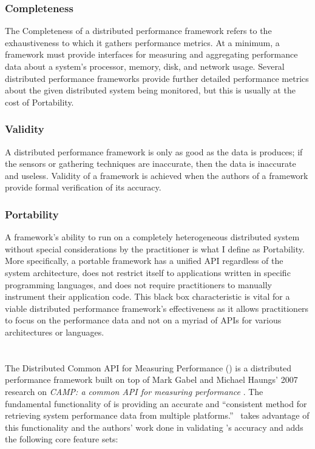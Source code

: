 \subsubsection{Completeness}

The Completeness of a distributed performance framework refers to the exhaustiveness to which it gathers performance
metrics. At a minimum, a framework must provide interfaces for measuring and aggregating performance data about a
system's processor, memory, disk, and network usage. Several distributed performance frameworks provide further detailed
performance metrics about the given distributed system being monitored, but this is usually at the cost of Portability.

\subsubsection{Validity}

A distributed performance framework is only as good as the data is produces; if the sensors or gathering techniques are
inaccurate, then the data is inaccurate and useless. Validity of a framework is achieved when the authors of a framework
provide formal verification of its accuracy.

\subsubsection{Portability}

A framework's ability to run on a completely heterogeneous distributed system without special considerations by the
practitioner is what I define as Portability. More specifically, a portable framework has a unified API regardless of
the system architecture, does not restrict itself to applications written in specific programming languages, and does
not require practitioners to manually instrument their application code. This black box characteristic is vital for a
viable distributed performance framework's effectiveness as it allows practitioners to focus on the performance data and
not on a myriad of APIs for various architectures or languages.

\section{\dcamp}
\label{dcamp}

The Distributed Common API for Measuring Performance (\dcamp) is a distributed performance framework built on top of
Mark Gabel and Michael Haungs' 2007 research on \emph{CAMP: a common API for measuring performance} \cite{gabel2007}.
The fundamental functionality of \camp is providing an accurate and ``consistent method for retrieving system
performance data from multiple platforms.'' \dcamp\ takes advantage of this functionality and the authors' work done in
validating \camp's accuracy and adds the following core feature sets:


